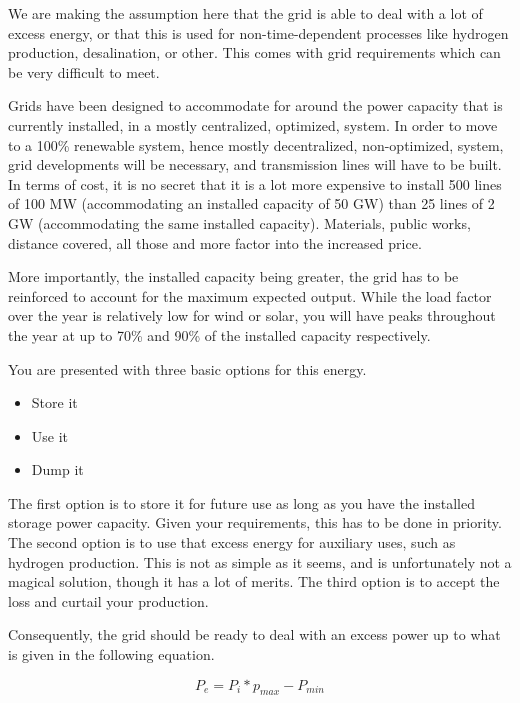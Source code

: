 We are making the assumption here that the grid is able to deal with a lot of excess energy, or that this is used for non-time-dependent processes like hydrogen production, desalination, or other. This comes with grid requirements which can be very difficult to meet.

Grids have been designed to accommodate for around the power capacity that is currently installed, in a mostly centralized, optimized, system. In order to move to a 100\% renewable system, hence mostly decentralized, non-optimized, system, grid developments will be necessary, and transmission lines will have to be built. In terms of cost, it is no secret that it is a lot more expensive to install 500 lines of 100 MW (accommodating an installed capacity of 50 GW) than 25 lines of 2 GW (accommodating the same installed capacity). Materials, public works, distance covered, all those and more factor into the increased price.

More importantly, the installed capacity being greater, the grid has to be reinforced to account for the maximum expected output. While the load factor over the year is relatively low for wind or solar, you will have peaks throughout the year at up to 70\% and 90\% of the installed capacity respectively. 

You are presented with three basic options for this energy.
\begin{itemize}
\item Store it
\item Use it
\item Dump it
\end{itemize}

The first option is to store it for future use as long as you have the installed storage power capacity. Given your requirements, this has to be done in priority. The second option is to use that excess energy for auxiliary uses, such as hydrogen production. This is not as simple as it seems, and is unfortunately not a magical solution, though it has a lot of merits. The third option is to accept the loss and curtail your production.


\begin{remark}
Consequently, the grid should be ready to deal with an excess power up to what is given in the following equation.

\begin{equation}\label{excess_power}
P_e = P_i * p_{max} - P_{min}
\end{equation}
\end{remark}


